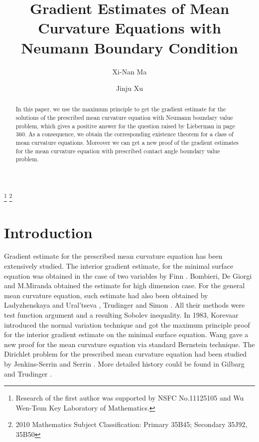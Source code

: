 \documentclass[11pt]{amsart}
\numberwithin{equation}{section}
\begin{document}
\setlength{\baselineskip}{1.2\baselineskip}
\title[Gradient Estimates]{Gradient Estimates of Mean Curvature Equations with Neumann Boundary Condition}

\author{Xi-Nan Ma}
\address{Department of Mathematics\\
         University of Science and Technology of China\\
         Hefei Anhui 230026 CHINA}
\author{Jinju Xu}
\address{Department of Mathematics\\
         University of Science and Technology of China\\
         Hefei Anhui 230026 CHINA}

\thanks{Research of the first author was supported by NSFC  No.11125105 and Wu Wen-Tsun Key Laboratory of Mathematics. }
\thanks{2010 Mathematics Subject Classification: Primary 35B45; Secondary 35J92, 35B50}

\maketitle

\begin{abstract}
In this paper, we use the maximum principle to get the gradient estimate for the solutions of the prescribed  mean curvature equation with Neumann boundary value problem, which gives a positive answer for the question raised by Lieberman \cite{Lieb13} in page 360.
As a consequence, we obtain the corresponding existence theorem for a class of mean curvature equations. Moreover  we can get a new proof of the gradient estimates for the mean curvature equation with prescribed contact angle boundary value problem.
\end{abstract}

\section{Introduction}
Gradient estimate for the prescribed mean curvature equation has been extensively studied. The interior gradient estimate, for the minimal surface equation was obtained in the case of two variables by Finn \cite{FN54}. Bombieri, De Giorgi and M.Miranda \cite{BGM69}  obtained the estimate for high dimension case. For the general mean curvature equation, such estimate had also been obtained by Ladyzhenskaya and Ural'tseva \cite{LU70}, Trudinger \cite{TR73} and Simon \cite{Sim76}. All their methods were test function argument and a resulting Sobolev inequality. In 1983, Korevaar \cite{Kor86} introduced the normal variation technique and got the maximum principle proof for the interior gradient estimate on the minimal surface equation. Wang \cite{Wang98} gave a new proof for the mean curvature equation via  standard Bernstein technique.  The Dirichlet problem for the prescribed mean curvature equation had  been  studied by Jenkins-Serrin \cite{JS68} and Serrin \cite{S69}. More detailed history could be found in Gilbarg and Trudinger \cite{GT01}.
\end{document}
